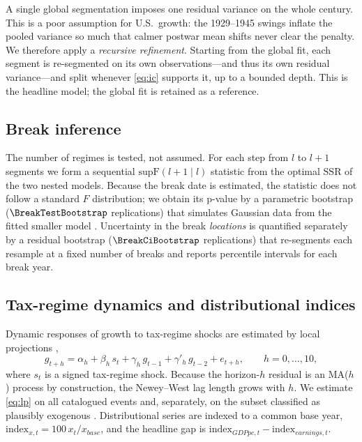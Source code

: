 \documentclass[11pt]{article}
\begin{document}
A single global segmentation imposes one residual variance on the whole century.
This is a poor assumption for U.S.\ growth: the 1929--1945 swings inflate the
pooled variance so much that calmer postwar mean shifts never clear the penalty.
We therefore apply a \emph{recursive refinement}. Starting from the global fit,
each segment is re-segmented on its own observations---and thus its own residual
variance---and split whenever \eqref{eq:ic} supports it, up to a bounded depth.
This is the headline model; the global fit is retained as a reference.

\subsection{Break inference}

The number of regimes is tested, not assumed. For each step from $l$ to $l+1$
segments we form a sequential $\mathrm{supF}(l+1\mid l)$ statistic from the
optimal $\mathrm{SSR}$ of the two nested models. Because the break date is
estimated, the statistic does not follow a standard $F$ distribution; we obtain
its p-value by a parametric bootstrap ($\BreakTestBootstrap$ replications) that
simulates Gaussian data from the fitted smaller model \citep{baiperron1998}.
Uncertainty in the break \emph{locations} is quantified separately by a residual
bootstrap ($\BreakCiBootstrap$ replications) that re-segments each resample at a
fixed number of breaks and reports percentile intervals for each break year.

\subsection{Tax-regime dynamics and distributional indices}

Dynamic responses of growth to tax-regime shocks are estimated by local
projections \citep{jorda2005},
\begin{equation}
  g_{t+h} = \alpha_h + \beta_h\, s_t + \gamma_h\, g_{t-1}
  + \gamma'_h\, g_{t-2} + e_{t+h}, \qquad h = 0,\dots,10,
  \label{eq:lp}
\end{equation}
where $s_t$ is a signed tax-regime shock. Because the horizon-$h$ residual is an
MA($h$) process by construction, the Newey--West lag length grows with $h$. We
estimate \eqref{eq:lp} on all catalogued events and, separately, on the subset
classified as plausibly exogenous \citep{romerromer2010}. Distributional series
are indexed to a common base year, $\mathrm{index}_{x,t} = 100\, x_t / x_{base}$,
and the headline gap is $\mathrm{index}_{GDPpc,t} - \mathrm{index}_{earnings,t}$.
\end{document}
